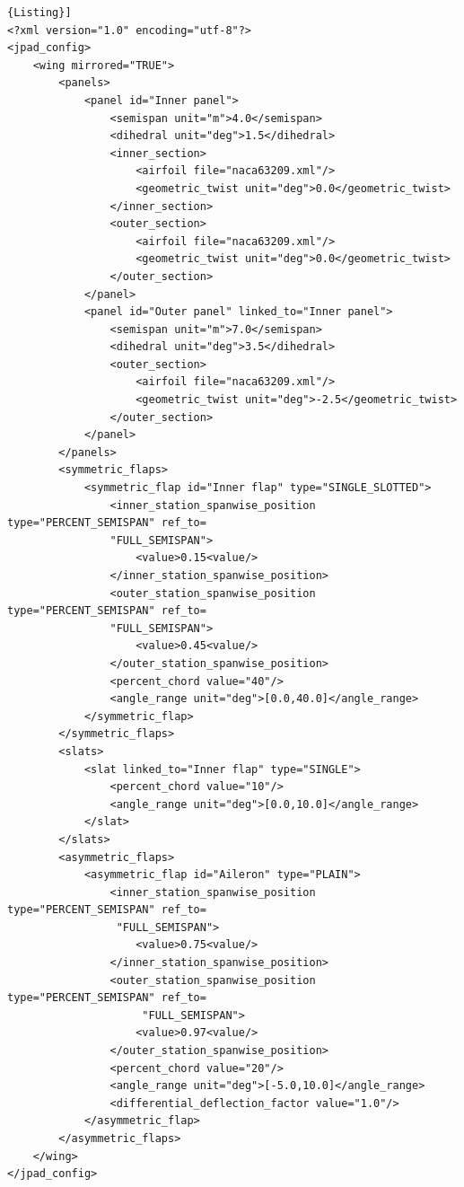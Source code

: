 \begin{lstlisting}[frame=rbl,style=MyxmlStyle, caption={{\footnotesize XML input file for an aircraft.}},label= [style=\bfseries]{Listing}]
<?xml version="1.0" encoding="utf-8"?>
<jpad_config>
    <wing mirrored="TRUE">
        <panels>
            <panel id="Inner panel">
                <semispan unit="m">4.0</semispan>
                <dihedral unit="deg">1.5</dihedral>
                <inner_section>
                    <airfoil file="naca63209.xml"/>
                    <geometric_twist unit="deg">0.0</geometric_twist>
                </inner_section>
                <outer_section>
                    <airfoil file="naca63209.xml"/>
                    <geometric_twist unit="deg">0.0</geometric_twist>
                </outer_section>
            </panel>
            <panel id="Outer panel" linked_to="Inner panel">
                <semispan unit="m">7.0</semispan>
                <dihedral unit="deg">3.5</dihedral>
                <outer_section>
                    <airfoil file="naca63209.xml"/>
                    <geometric_twist unit="deg">-2.5</geometric_twist>
                </outer_section>
            </panel>
        </panels>
        <symmetric_flaps>
            <symmetric_flap id="Inner flap" type="SINGLE_SLOTTED">
                <inner_station_spanwise_position type="PERCENT_SEMISPAN" ref_to=
                "FULL_SEMISPAN">
                    <value>0.15<value/>
                </inner_station_spanwise_position>
                <outer_station_spanwise_position type="PERCENT_SEMISPAN" ref_to=
                "FULL_SEMISPAN">
                    <value>0.45<value/>
                </outer_station_spanwise_position>
                <percent_chord value="40"/>
                <angle_range unit="deg">[0.0,40.0]</angle_range>
            </symmetric_flap>
        </symmetric_flaps>
        <slats>
            <slat linked_to="Inner flap" type="SINGLE">
                <percent_chord value="10"/>
                <angle_range unit="deg">[0.0,10.0]</angle_range>
            </slat>
        </slats>
        <asymmetric_flaps>
            <asymmetric_flap id="Aileron" type="PLAIN">
                <inner_station_spanwise_position type="PERCENT_SEMISPAN" ref_to=
                 "FULL_SEMISPAN">
                    <value>0.75<value/>
                </inner_station_spanwise_position>
                <outer_station_spanwise_position type="PERCENT_SEMISPAN" ref_to=
                     "FULL_SEMISPAN">
                    <value>0.97<value/>
                </outer_station_spanwise_position>
                <percent_chord value="20"/>
                <angle_range unit="deg">[-5.0,10.0]</angle_range>
                <differential_deflection_factor value="1.0"/>
            </asymmetric_flap>
        </asymmetric_flaps>
    </wing>
</jpad_config>
\end{lstlisting}

